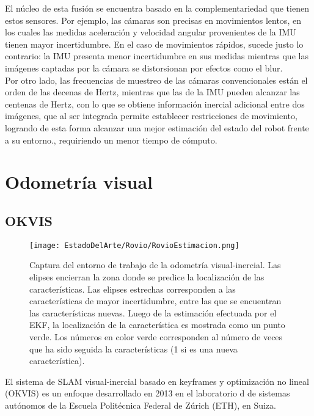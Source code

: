 El núcleo de esta fusión se encuentra basado en la complementariedad que tienen estos sensores. Por ejemplo, las cámaras son precisas en movimientos lentos, en los cuales las medidas aceleración y velocidad angular provenientes de la IMU tienen mayor incertidumbre. En el caso de movimientos rápidos, sucede justo lo contrario: la IMU presenta menor incertidumbre en sus medidas mientras que las imágenes captadas por la cámara se distorsionan por efectos como el blur. \\

Por otro lado,  las frecuencias de muestreo de las cámaras convencionales están el orden de las decenas de Hertz, mientras que las de la IMU pueden alcanzar las centenas de Hertz, con lo que se  obtiene información inercial adicional entre dos imágenes, que al ser integrada permite establecer restricciones de movimiento,  logrando de esta forma alcanzar una mejor estimación del estado del robot frente a su entorno., requiriendo un menor tiempo de cómputo. \\
\section{Odometría visual}



\subsection{OKVIS}

\begin{figure}[H]
	\centering
	\texttt{[image: EstadoDelArte/Rovio/RovioEstimacion.png]}
	\caption{Captura del entorno de trabajo de la odometría visual-inercial. Las elipses encierran la zona donde se predice la localización de las características. Las elipses estrechas corresponden a las características de mayor incertidumbre, entre las que se encuentran las características nuevas. Luego de la estimación efectuada por el EKF, la localización de la característica es mostrada como un punto verde. Los números en color verde corresponden al número de veces que ha sido seguida la características (1 si es una nueva característica).}
	\label{fig:RovioEstimacion}
\end{figure}


El sistema de SLAM visual-inercial basado en keyframes y optimización no lineal (OKVIS)  es un enfoque desarrollado en 2013 en el laboratorio d de sistemas autónomos de la Escuela Politécnica Federal de Zúrich (ETH), en Suiza.

